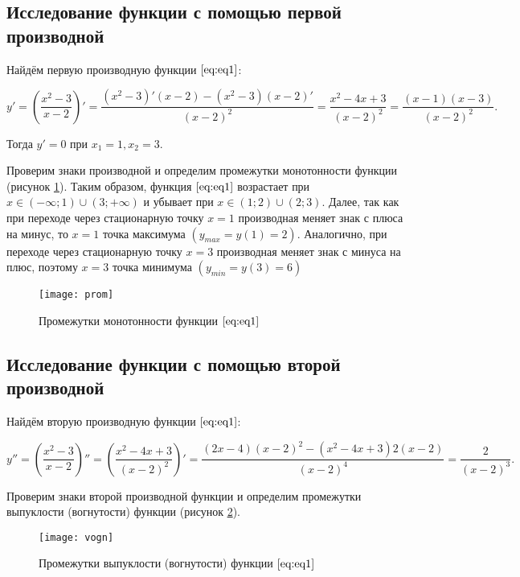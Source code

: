 \subsection{Исследование функции с помощью первой производной}

Найдём первую производную функции $\eqref{eq:eq1}$:

\[y' = \left(\frac{x^2-3}{x-2}\right)' = \frac{(x^2-3)'(x-2)-(x^2-3)(x-2)'}{(x-2)^2}  = \frac{x^2-4x+3}{(x-2)^2} = \frac{(x-1)(x-3)}{(x-2)^2}.\]

Тогда $y' = 0$ при $x_1 = 1, x_2 = 3$.

Проверим знаки производной и определим промежутки монотонности функции (рисунок \ref{pic:prom}). Таким образом, функция $\eqref{eq:eq1}$ возрастает при $x \in (-\infty;1) \cup (3; +\infty)$ и убывает при $x \in (1;2) \cup (2;3)$. Далее, так как при переходе через стационарную точку $x = 1$ производная меняет знак с плюса на минус, то $x=1$ точка максимума $(y_{max} = y(1) = 2)$. Аналогично, при переходе через стационарную точку
$x = 3$ производная меняет знак с минуса на плюс, поэтому $x = 3$ точка минимума $(y_{min} = y(3) = 6)$

\begin{figure}[H]
	\begin{center}
		\texttt{[image: prom]}
		\caption{Промежутки монотонности функции $\eqref{eq:eq1}$}
		\label{pic:prom}
	\end{center}
\end{figure}

\subsection{Исследование функции с помощью второй производной}

Найдём вторую производную функции $\eqref{eq:eq1}$:

\[y'' = \left(\frac{x^2-3}{x-2}\right)'' = \left(\frac{x^2-4x+3}{(x-2)^2}\right)' = \frac{(2x-4)(x-2)^2 - (x^2-4x+3)2(x-2)}{(x-2)^4} = \frac{2}{(x-2)^3}.\]

Проверим знаки второй производной функции и определим промежутки выпуклости (вогнутости) функции (рисунок \ref{pic:vogn}).

\begin{figure}[H]
	\begin{center}
		\texttt{[image: vogn]}
		\caption{Промежутки выпуклости (вогнутости) функции $\eqref{eq:eq1}$}
		\label{pic:vogn}
	\end{center}
\end{figure}

